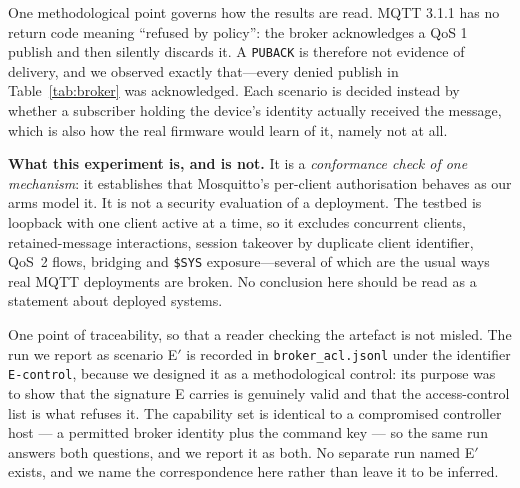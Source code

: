 One methodological point governs how the results are read. MQTT 3.1.1 has no return code
meaning ``refused by policy'': the broker acknowledges a QoS 1 publish and then silently
discards it. A \texttt{PUBACK} is therefore not evidence of delivery, and we observed exactly
that---every denied publish in Table~\ref{tab:broker} was acknowledged. Each scenario is
decided instead by whether a subscriber holding the device's identity actually received the
message, which is also how the real firmware would learn of it, namely not at all.

\textbf{What this experiment is, and is not.} It is a \emph{conformance check of one mechanism}:
it establishes that Mosquitto's per-client authorisation behaves as our arms model it. It is not a
security evaluation of a deployment. The testbed is loopback with one client active at a time, so
it excludes concurrent clients, retained-message interactions, session takeover by duplicate
client identifier, QoS~2 flows, bridging and \texttt{\$SYS} exposure---several of which are the
usual ways real MQTT deployments are broken. No conclusion here should be read as a statement about
deployed systems.

One point of traceability, so that a reader checking the artefact is not misled. The run we report
as scenario E$'$ is recorded in \texttt{broker\_acl.jsonl} under the identifier
\texttt{E-control}, because we designed it as a methodological control: its purpose was to show
that the signature E carries is genuinely valid and that the access-control list is what refuses
it. The capability set is identical to a compromised controller host --- a permitted broker
identity plus the command key --- so the same run answers both questions, and we report it as
both. No separate run named E$'$ exists, and we name the correspondence here rather than leave it
to be inferred.

